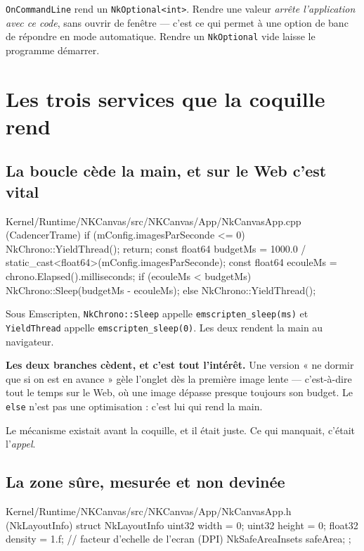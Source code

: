 \begin{nkpiege}
\texttt{OnCommandLine} rend un \texttt{NkOptional<int>}. Rendre une valeur
\emph{arrête l'application avec ce code}, sans ouvrir de fenêtre --- c'est ce qui
permet à une option de banc de répondre en mode automatique. Rendre un
\texttt{NkOptional} vide laisse le programme démarrer.
\end{nkpiege}

\section{Les trois services que la coquille rend}

\subsection{La boucle cède la main, et sur le Web c'est vital}

\begin{nkcode}{Kernel/Runtime/NKCanvas/src/NKCanvas/App/NkCanvasApp.cpp (CadencerTrame)}
if (mConfig.imagesParSeconde <= 0) {
    NkChrono::YieldThread();
    return;
}
const float64 budgetMs = 1000.0 / static_cast<float64>(mConfig.imagesParSeconde);
const float64 ecouleMs = chrono.Elapsed().milliseconds;
if (ecouleMs < budgetMs) {
    NkChrono::Sleep(budgetMs - ecouleMs);
} else {
    NkChrono::YieldThread();
}
\end{nkcode}

Sous Emscripten, \texttt{NkChrono::Sleep} appelle \texttt{emscripten\_sleep(ms)}
et \texttt{YieldThread} appelle \texttt{emscripten\_sleep(0)}. Les deux rendent
la main au navigateur.

\begin{nkpiege}
\textbf{Les deux branches cèdent, et c'est tout l'intérêt.} Une version
« ne dormir que si on est en avance » gèle l'onglet dès la première image lente
--- c'est-à-dire tout le temps sur le Web, où une image dépasse presque toujours
son budget. Le \texttt{else} n'est pas une optimisation : c'est lui qui rend la
main.

Le mécanisme existait avant la coquille, et il était juste. Ce qui manquait,
c'était l'\emph{appel}.
\end{nkpiege}

\subsection{La zone sûre, mesurée et non devinée}

\begin{nkcode}{Kernel/Runtime/NKCanvas/src/NKCanvas/App/NkCanvasApp.h (NkLayoutInfo)}
struct NkLayoutInfo {
    uint32 width  = 0;
    uint32 height = 0;
    float32 density = 1.f;   // facteur d'echelle de l'ecran (DPI)
    NkSafeAreaInsets safeArea;
};
\end{nkcode}

